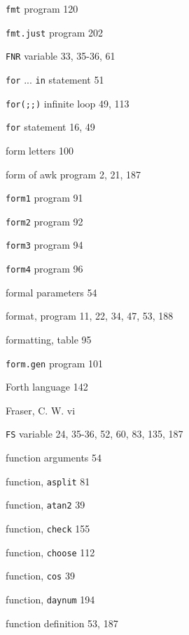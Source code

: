 \begin{multicols}{3}
\hangindent=3pc  \verb'fmt' program 120

\hangindent=3pc  \verb'fmt.just' program 202

\hangindent=3pc  \verb'FNR' variable 33, 35-36, 61

\hangindent=3pc  \verb'for' ... \verb'in' statement 51

\hangindent=3pc  \verb'for(;;)' infinite loop 49, 113

\hangindent=3pc  \verb'for' statement 16, 49

\hangindent=3pc  form letters 100

\hangindent=3pc  form of awk program 2, 21, 187

\hangindent=3pc  \verb'form1' program 91

\hangindent=3pc  \verb'form2' program 92

\hangindent=3pc  \verb'form3' program 94

\hangindent=3pc  \verb'form4' program 96

\hangindent=3pc  formal parameters 54

\hangindent=3pc  format, program 11, 22, 34, 47, 53, 188

\hangindent=3pc  formatting, table 95

\hangindent=3pc  \verb'form.gen' program 101

\hangindent=3pc  Forth language 142

\hangindent=3pc  Fraser, C. W. vi

\hangindent=3pc  \verb'FS' variable 24, 35-36, 52, 60, 83, 135, 187

\hangindent=3pc  function arguments 54

\hangindent=3pc  function, \verb'asplit' 81

\hangindent=3pc  function, \verb'atan2' 39

\hangindent=3pc  function, \verb'check' 155

\hangindent=3pc  function, \verb'choose' 112

\hangindent=3pc  function, \verb'cos' 39

\hangindent=3pc  function, \verb'daynum' 194

\hangindent=3pc  function definition 53, 187


\end{multicols}

